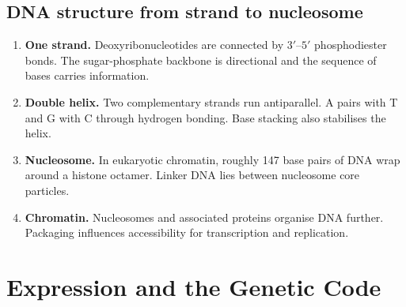 \documentclass[12pt,a4paper]{article}
\begin{document}
\subsection{DNA structure from strand to nucleosome}
\begin{enumerate}[leftmargin=*, itemsep=3pt, topsep=4pt]
  \item \textbf{One strand.} Deoxyribonucleotides are connected by $3'$--$5'$ phosphodiester bonds. The sugar-phosphate backbone is directional and the sequence of bases carries information.
  \item \textbf{Double helix.} Two complementary strands run antiparallel. A pairs with T and G with C through hydrogen bonding. Base stacking also stabilises the helix.
  \item \textbf{Nucleosome.} In eukaryotic chromatin, roughly 147 base pairs of DNA wrap around a histone octamer. Linker DNA lies between nucleosome core particles.
  \item \textbf{Chromatin.} Nucleosomes and associated proteins organise DNA further. Packaging influences accessibility for transcription and replication.
\end{enumerate}
\begin{tcolorbox}[tikzbox, title={Levels of eukaryotic DNA packaging}]
\centering
{}\par
\end{tcolorbox}

\section{Expression and the Genetic Code}
\end{document}
